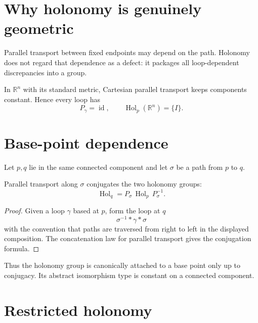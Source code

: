 \section{Why holonomy is genuinely geometric}

\begin{remark}\label{rem:vii25-path}
Parallel transport between fixed endpoints may depend on the path.  Holonomy does
not regard that dependence as a defect: it packages all loop-dependent
discrepancies into a group.
\end{remark}

\begin{example}\label{ex:vii25-euclidean}
In \(\mathbb R^n\) with its standard metric, Cartesian parallel transport keeps
components constant.  Hence every loop has
\[
P_\gamma=\operatorname{id},
\qquad
\operatorname{Hol}_p(\mathbb R^n)=\{I\}.
\]
\end{example}

\section{Base-point dependence}

Let \(p,q\) lie in the same connected component and let
\(\sigma\) be a path from \(p\) to \(q\).

\begin{theorem}\label{thm:vii25-basepoint}
Parallel transport along \(\sigma\) conjugates the two holonomy groups:
\[
\operatorname{Hol}_q
=
P_\sigma\,
\operatorname{Hol}_p\,
P_\sigma^{-1}.
\]
\end{theorem}

\begin{proof}
Given a loop \(\gamma\) based at \(p\), form the loop at \(q\)
\[
\sigma^{-1}*\gamma*\sigma
\]
with the convention that paths are traversed from right to left in the displayed
composition.  The concatenation law for parallel transport gives the conjugation
formula.
\end{proof}

\begin{remark}
Thus the holonomy group is canonically attached to a base point only up to
conjugacy.  Its abstract isomorphism type is constant on a connected component.
\end{remark}

\section{Restricted holonomy}

